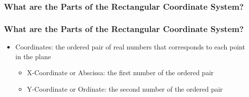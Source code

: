 \documentclass[14pt]{beamer}
\begin{document}
   \begin{frame}
      	\frametitle{What are the Parts of the Rectangular Coordinate System?}
   	    
   	    \pause {}
   	    
   	    \pause {}
   	    
   	    \pause {}
   	    
   	    \pause {}
   	    
   	    \pause {}
       
       \pause {}

    \pause {}   

    \pause {}  
   \end{frame}

    \begin{frame}
    	\frametitle{What are the Parts of the Rectangular Coordinate System?}
    	\begin{itemize}
    		\item Coordinates: the ordered pair of real numbers that corresponds to each point in the plane
    	    \begin{itemize}
    	    	\item<2-> X-Coordinate or Abscissa: the first number of the ordered pair
       	    	\item<3-> Y-Coordinate or Ordinate: the second  number of the ordered pair
    	    \end{itemize}
    	\end{itemize}
    \end{frame}
\end{document}
